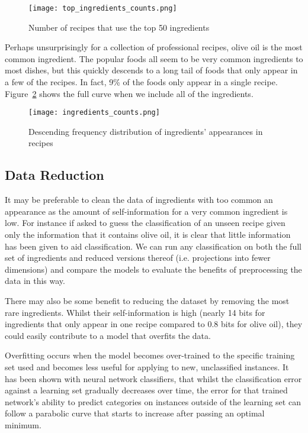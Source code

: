 \documentclass[11pt,a4paper]{article}
\begin{document}
\begin{figure}[p]
  \texttt{[image: top\_ingredients\_counts.png]}
  \caption{Number of recipes that use the top 50 ingredients\label{top-ingredients}}
\end{figure}

Perhaps unsurprisingly for a collection of professional recipes, olive oil is the most
common ingredient. The popular foods all seem to be very common ingredients to most
dishes, but this quickly descends to a long tail of foods that only appear in a few
of the recipes. In fact, 9\% of the foods only appear in a single recipe.
Figure~\ref{ingredients-counts} shows the full curve when we include all of the
ingredients.

\begin{figure}[p]
  \texttt{[image: ingredients\_counts.png]}
  \caption{Descending frequency distribution of ingredients' appearances in recipes\label{ingredients-counts}}
\end{figure}

\subsection{Data Reduction}
\label{sec:data-reduction}
It may be preferable to clean the data of ingredients
with too common an appearance as the amount of
self-information \cite{reza1961introduction} for a very common ingredient is low. For
instance if asked to guess the classification of an unseen recipe given only
the information that it contains olive oil, it is clear that little information
has been given to aid classification. We can run any classification on
both the full set of ingredients
and reduced versions thereof (i.e. projections into fewer dimensions) and compare
the models to evaluate the benefits of preprocessing the data in this way.

There may also be some benefit to reducing the dataset by removing the most rare
ingredients. Whilst their self-information is high (nearly 14 bits for ingredients
that only appear in one recipe compared to 0.8 bits for olive oil), they could
easily contribute to a model that overfits the data.

Overfitting occurs when the model becomes over-trained to the specific training set
used and becomes less useful for applying to new, unclassified instances. It has
been shown \cite{tetko1995neural} with neural network classifiers, that whilst the
classification error against a learning set gradually decreases over time, the
error for that trained network's ability to predict categories on instances outside of the
learning set can follow a parabolic curve that starts to increase after passing an
optimal minimum.
\end{document}
